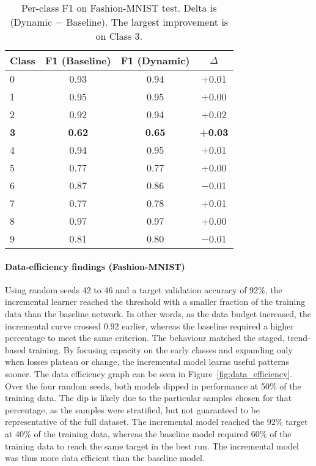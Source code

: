 \documentclass[conference]{IEEEtran}
\begin{document}
\begin{table}[H]
  \centering
  \caption{Per-class F1 on Fashion-MNIST test. Delta is (Dynamic $-$ Baseline). The largest improvement is on Class 3.}
  \label{tab:fashion_per_class_f1}
  \scriptsize
  \setlength{\tabcolsep}{6pt}
  \begin{tabular}{@{}lccc@{}}
    \toprule
 Class & F1 (Baseline) & F1 (Dynamic) & $\Delta$ \\
    \midrule
 0 & 0.93 & 0.94 & +0.01 \\
 1 & 0.95 & 0.95 & +0.00 \\
 2 & 0.92 & 0.94 & +0.02 \\
    \textbf{3} & \textbf{0.62} & \textbf{0.65} & \textbf{+0.03} \\
 4 & 0.94 & 0.95 & +0.01 \\
 5 & 0.77 & 0.77 & +0.00 \\
 6 & 0.87 & 0.86 & $-$0.01 \\
 7 & 0.77 & 0.78 & +0.01 \\
 8 & 0.97 & 0.97 & +0.00 \\
 9 & 0.81 & 0.80 & $-$0.01 \\
    \bottomrule
  \end{tabular}
\end{table}

\paragraph{Data-efficiency findings (Fashion-MNIST)}
 Using random seeds 42 to 46 and a target validation accuracy of 92\%, the incremental learner
 reached the threshold with a smaller fraction of the training data than the baseline network. In other words, as the data budget increased, 
 the incremental curve crossed 0.92 earlier, whereas the baseline required a higher percentage to meet the same criterion. The behaviour 
matched the staged, trend-based training. By focusing capacity on the early classes and expanding only when losses plateau or change, the 
incremental model learns useful patterns sooner. The data efficiency graph can be seen in Figure~\ref{fig:data_efficiency}.
Over the four random seeds, both models dipped in performance at 50\% of the training data. The dip is likely due to the 
 particular samples chosen for that percentage, as the samples were stratified, but not guaranteed to be representative of the full dataset. 
 The incremental model reached the 92\% target at 40\% of the training data, whereas the baseline model required 60\% of the training data
 to reach the same target in the best run. The incremental model was thus more data efficient than the baseline model.
\end{document}
